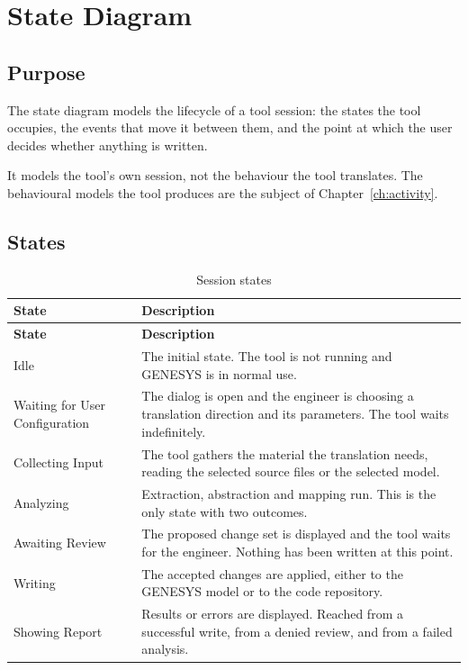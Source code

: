 \chapter{State Diagram}
\label{ch:state}

\section{Purpose}

The state diagram models the lifecycle of a tool session: the states the tool
occupies, the events that move it between them, and the point at which the user
decides whether anything is written.

It models the tool's own session, not the behaviour the tool translates. The
behavioural models the tool produces are the subject of
Chapter~\ref{ch:activity}.


\section{States}

\begin{longtable}{L{0.26\textwidth}L{0.66\textwidth}}
	\caption{Session states}\label{tab:states}\\
	\toprule
	\textbf{State} & \textbf{Description} \\
	\midrule
	\endfirsthead
	\toprule
	\textbf{State} & \textbf{Description} \\
	\midrule
	\endhead

	Idle & The initial state. The tool is not running and GENESYS is in normal
	use. \\
	\addlinespace
	Waiting for User Configuration & The dialog is open and the engineer is
	choosing a translation direction and its parameters. The tool waits
	indefinitely. \\
	\addlinespace
	Collecting Input & The tool gathers the material the translation needs,
	reading the selected source files or the selected model. \\
	\addlinespace
	Analyzing & Extraction, abstraction and mapping run. This is the only state
	with two outcomes. \\
	\addlinespace
	Awaiting Review & The proposed change set is displayed and the tool waits for
	the engineer. Nothing has been written at this point. \\
	\addlinespace
	Writing & The accepted changes are applied, either to the GENESYS model or to
	the code repository. \\
	\addlinespace
	Showing Report & Results or errors are displayed. Reached from a successful
	write, from a denied review, and from a failed analysis. \\
	\bottomrule
\end{longtable}

